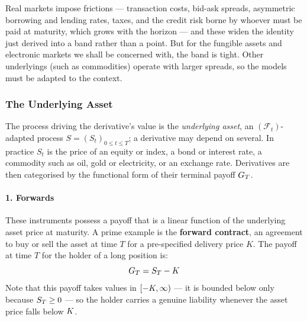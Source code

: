 




Real markets impose frictions --- transaction costs, bid-ask spreads, asymmetric borrowing and
lending rates, taxes, and the credit risk borne by whoever must be paid at maturity, which grows
with the horizon --- and these widen the identity just derived into a band rather than a point. But
for the fungible assets and electronic markets we shall be concerned with, the band is tight. Other underlyings (such as commodities) operate with larger spreads, so the models must be adapted to the context.

\subsubsection*{The Underlying Asset}
The process driving the derivative's value is the \textit{underlying asset}, an
$(\mathcal{F}_t)$-adapted process $S = (S_t)_{0\leq t\leq T}$; a derivative may depend on several. In
practice $S_t$ is the price of an equity or index, a bond or interest rate, a commodity such as oil, gold or electricity, or an exchange rate.
Derivatives are then categorised by the functional form of their terminal payoff $G_T$.



\paragraph{1. Forwards}
These instruments possess a payoff that is a linear function of the underlying asset price at maturity. A prime example is the \textbf{forward contract}, an agreement to buy or sell the asset at time $T$ for a pre-specified delivery price $K$. The payoff at time $T$ for the holder of a long position is:
\begin{equation}
    G_T = S_T - K
\end{equation}
Note that this payoff takes values in $[-K,\infty)$ --- it is bounded below only because $S_T \geq 0$ --- so the holder carries a genuine liability whenever the asset price falls below $K$.

